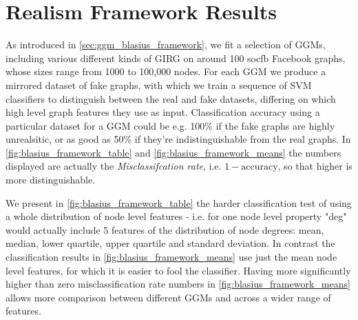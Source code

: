 \section{Realism Framework Results}

As introduced in \cref{sec:ggm_blasius_framework}, we fit a selection of GGMs, including various different kinds of GIRG on around 100 socfb Facebook graphs, whose sizes range from 1000 to 100,000 nodes. For each GGM we produce a mirrored dataset of fake graphs, with which we train a sequence of SVM classifiers to distinguish between the real and fake datasets, differing on which high level graph features they use as input. Classification accuracy using a particular dataset for a GGM could be e.g. 100\% if the fake graphs are highly unrealsitic, or as good as 50\% if they're indistinguishable from the real graphs. In \cref{fig:blasius_framework_table} and \cref{fig:blasius_framework_means} the numbers displayed are actually the \textit{Misclassifcation rate}, i.e. $1 - \text{accuracy}$, so that higher is more distinguishable.

We present in \cref{fig:blasius_framework_table} the harder classification test of using a whole distribution of node level features - i.e. for one node level property "deg" would actually include 5 features of the distribution of node degrees: mean, median, lower quartile, upper quartile and standard deviation. In contrast the classification results in \cref{fig:blasius_framework_means} use just the mean node level features, for which it is easier to fool the classifier. Having more significantly higher than zero misclassification rate numbers in \cref{fig:blasius_framework_means} allows more comparison between different GGMs and across a wider range of features.


